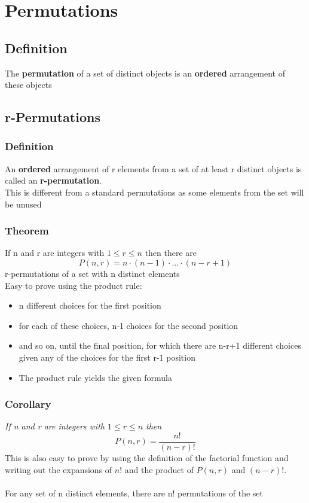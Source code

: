 \documentclass{article}[18pt]
\begin{document}
\section{Permutations}
\subsection{Definition}
The \textbf{permutation} of a set of distinct objects is an \textbf{ordered} arrangement of these objects\\

\subsection{r-Permutations}
\subsubsection{Definition}
An \textbf{ordered} arrangement of r elements from a set of at least r distinct objects is called an \textbf{r-permutation}.\\
This is different from a standard permutations as some elements from the set will be unused
\subsubsection{Theorem}
If n and r are integers with $1\leqslant r\leqslant n$ then there are
$$P(n,r)=n\cdot (n-1)\cdot...\cdot (n-r+1)$$
r-permutations of a set with n distinct elements\\
Easy to prove using the product rule:
\begin{itemize}
\item n different choices for the first position
\item for each of these choices, n-1 choices for the second position
\item and so on, until the final position, for which there are n-r+1 different choices given any of the choices for the first r-1 position
\item The product rule yields the given formula
\end{itemize}
\subsubsection{Corollary}
\textit{If n and r are integers with $1\leqslant r\leqslant n$ then}
$$P(n,r)=\frac{n!}{(n-r)!}$$
This is also easy to prove by using the definition of the factorial function and writing out the expansions of $n!$ and the product of $P(n,r)$ and $(n-r)!$.\\
\\
For any set of n distinct elements, there are n! permutations of the set
\end{document}
